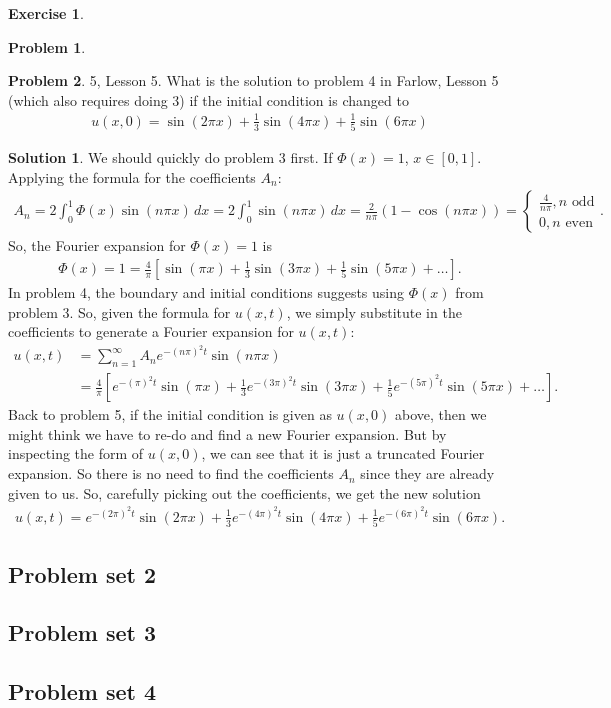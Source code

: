 \documentclass{article}
\theoremstyle{definition}
\newtheorem*{prob*}{Problem}
\newtheorem{exer}{Exercise}[section]
\newtheorem*{sln*}{Solution}
\begin{document}
\begin{exer}
\begin{prob*}
	\end{prob*}
	\newpage
	\begin{prob*}5, Lesson 5. What is the solution to problem 4 in Farlow, Lesson 5 (which also requires doing 3) if the initial condition is changed to 
		\begin{align*}
		u(x,0) = \sin(2\pi x) + \frac{1}{3}\sin(4\pi x) + \frac{1}{5}\sin(6\pi x)
		\end{align*}
		\begin{sln*}
			We should quickly do problem 3 first. If $\Phi(x) = 1$, $x\in[0,1]$. Applying the formula for the coefficients $A_n$:
			\begin{align*}
			A_n = 2\int_0^1\Phi(x)\sin(n\pi x)\,dx = 2\int_0^1\sin(n\pi x)\,dx = \frac{2}{n\pi}(1-\cos(n\pi x)) = \begin{cases}
			\frac{4}{n\pi}, n \text{ odd}\\
			0, n\text{ even}
			\end{cases}.
			\end{align*}
			So, the Fourier expansion for $\Phi(x) = 1$ is
			\begin{align*}
			\Phi(x) =1 = \frac{4}{\pi}\left[\sin(\pi x) + \frac{1}{3}\sin(3\pi x) + \frac{1}{5}\sin(5\pi x)+\dots \right].
			\end{align*}
			In problem 4, the boundary and initial conditions suggests using $\Phi(x)$ from problem 3. So, given the formula for $u(x,t)$, we simply substitute in the coefficients to generate a Fourier expansion for $u(x,t)$:
			\begin{align*}
			u(x,t) &= \sum_{n=1}^{\infty}A_n e^{-(n\pi)^2t}\sin(n\pi x)\\
			&= \frac{4}{\pi}\left[ e^{-(\pi)^2t}\sin(\pi x) + \frac{1}{3}e^{-(3\pi)^2t}\sin(3\pi x)
			+ \frac{1}{5}e^{-(5\pi)^2t}\sin(5\pi x)+\dots\right].
			\end{align*}
			Back to problem 5, if the initial condition is given as $u(x,0)$ above, then we might think we have to re-do and find a new Fourier expansion. But by inspecting the form of $u(x,0)$, we can see that it is just a truncated Fourier expansion. So there is no need to find the coefficients $A_n$ since they are already given to us. So, carefully picking out the coefficients, we get the new solution
			\begin{align*}
			u(x,t) = e^{-(2\pi)^2t}\sin(2\pi x) + \frac{1}{3}e^{-(4\pi)^2t}\sin(4\pi x) + \frac{1}{5}e^{-(6\pi)^2t}\sin(6\pi x).
			\end{align*}
		\end{sln*}
	\end{prob*}
\end{exer}

\newpage
\subsection{Problem set 2}

\newpage
\subsection{Problem set 3}

\newpage
\subsection{Problem set 4}
\end{document}
